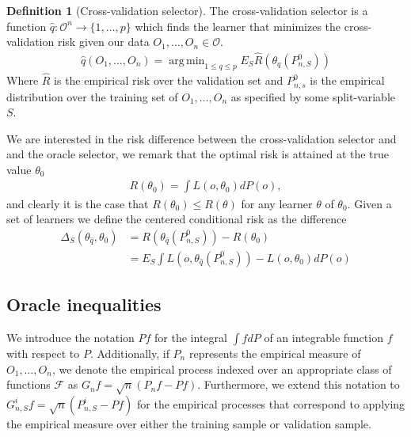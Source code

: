 \documentclass[11pt, a4paper]{article}
\DeclareMathOperator*{\argmin}{arg\,min}
\theoremstyle{definition}
\newtheorem{definition}[theorem]{Definition}
\theoremstyle{remark}
\newcommand{\cl}{q}
\begin{document}
\begin{definition}[Cross-validation selector]
    The cross-validation selector is a function $ \hat{\cl}: \mathcal{O}^{n} \to \{1,\ldots,p\} $  which finds the learner that minimizes the cross-validation risk given our data $ O_1 , \dots , O_n \in \mathcal{O} $. 
    \begin{align*}
        \hat{\cl}(O_1 , \dots , O_n) = \argmin_{1 \leq \cl \leq p} E_S \hat{R} ( \theta _\cl (P_{n,S}^0 )) 
    \end{align*}
    Where $ \hat{R}  $ is the empirical risk over the validation set and $ P_{n ,s}^{0} $ is the empirical distribution over the training set of $ O_1 , \dots , O_n  $ as specified by some split-variable $ S $. 
\end{definition}
We are interested in the risk difference between the cross-validation selector and and the oracle selector, we remark that the optimal risk is attained at the true value $ \theta_0 $ 
\begin{align*}
    R(\theta_0) = \int L(o, \theta_0)  dP(o),
\end{align*}
and clearly it is the case that $ R(\theta_0) \leq R( \theta  ) $ for any learner $ \theta $ of $ \theta_0 $.
Given a set of learners we define the centered conditional risk as the difference 
\begin{align*}
    \Delta_{S}( \theta_{ \hat{\cl} }, \theta_0 ) &= R( \theta _{ \hat{\cl} }(P_{n, S}^{0})) -R(\theta_0) \\
                                                       &= E_{S} \int L(o, \theta_{ \hat{\cl} }(P_{n, S}^{0})) - L(o, \theta_0) dP(o) 
\end{align*}

\subsection{Oracle inequalities}
We introduce the notation $Pf$ for the integral $\int f dP$ of an integrable function $f$ with respect to $P$. Additionally, if $P_n$ represents the empirical measure of $O_1, \dots, O_n$, we denote the empirical process indexed over an appropriate class of functions $\mathcal{F}$ as $G_n f = \sqrt{n}(P_n f - P f)$. Furthermore, we extend this notation to $G_{n, S}^{i} f = \sqrt{n}(P_{n, S}^{i} - Pf)$ for the empirical processes that correspond to applying the empirical measure over either the training sample or validation sample.
\end{document}
